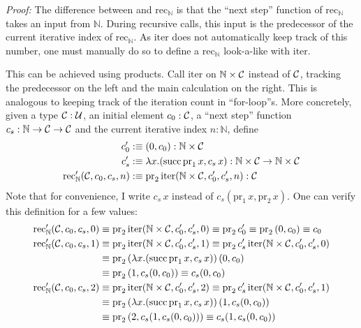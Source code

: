 \textit{Proof:} The difference between  and $\text{rec}_{\mathbb{N}}$ is that the ``next step'' function of $\text{rec}_{\mathbb{N}}$ takes an input from $\mathbb{N}$. During recursive calls, this input is the predecessor of the current iterative index of $\text{rec}_{\mathbb{N}}$. As $\text{iter}$ does not automatically keep track of this number, one must manually do so to define a $\text{rec}_{\mathbb{N}}$ look-a-like with $\text{iter}$.

This can be achieved using products. Call $\text{iter}$ on $\mathbb{N} \times \mathcal{C}$ instead of $\mathcal{C}$, tracking the predecessor on the left and the main calculation on the right. This is analogous to keeping track of the iteration count in ``for-loop''s. More concretely, given a type $\mathcal{C} : \mathcal{U}$, an initial element $c_{0} : \mathcal{C}$, a ``next step'' function $c_{s} : \mathbb{N} \to \mathcal{C} \to \mathcal{C}$ and the current iterative index $n : \mathbb{N}$, define
\begin{align*}
	c'_{0} &:\equiv (0, c_{0}) : \mathbb{N} \times \mathcal{C} \\
	c'_{s} &:\equiv \lambda x.(\text{succ}\,\text{pr}_{1}\,x,c_{s}\,x) : \mathbb{N} \times \mathcal{C} \to \mathbb{N} \times \mathcal{C} \\
	\text{rec}'_{\mathbb{N}}(\mathcal{C}, c_{0}, c_{s}, n) &:\equiv \text{pr}_{2}\,\text{iter}(\mathbb{N} \times \mathcal{C}, c'_{0}, c'_{s}, n) : \mathcal{C}
\end{align*}
Note that for convenience, I write $c_{s}\,x$ instead of $c_{s}(\text{pr}_{1}\,x,\text{pr}_{2}\,x)$. One can verify this definition for a few values:
\begin{align*}
	\text{rec}'_{\mathbb{N}}(\mathcal{C}, c_{0}, c_{s}, 0) &\equiv \text{pr}_{2}\,\text{iter}(\mathbb{N} \times \mathcal{C}, c'_{0}, c'_{s}, 0) \equiv \text{pr}_{2}\,c'_{0} \equiv \text{pr}_{2}\,(0,c_{0}) \equiv c_{0} \\
	\text{rec}'_{\mathbb{N}}(\mathcal{C}, c_{0}, c_{s}, 1) &\equiv \text{pr}_{2}\,\text{iter}(\mathbb{N} \times \mathcal{C}, c'_{0}, c'_{s}, 1) \equiv \text{pr}_{2}\,c'_{s}\,\text{iter}(\mathbb{N} \times \mathcal{C}, c'_{0}, c'_{s}, 0) \\
	&\equiv \text{pr}_{2}\,(\lambda x.(\text{succ}\,\text{pr}_{1}\,x,c_{s}\,x))\,(0,c_{0}) \\
	&\equiv \text{pr}_{2}\,(1,c_{s}(0,c_{0})) \equiv c_{s}(0,c_{0}) \\
	\text{rec}'_{\mathbb{N}}(\mathcal{C}, c_{0}, c_{s}, 2) &\equiv \text{pr}_{2}\,\text{iter}(\mathbb{N} \times \mathcal{C}, c'_{0}, c'_{s}, 2) \equiv \text{pr}_{2}\,c'_{s}\,\text{iter}(\mathbb{N} \times \mathcal{C}, c'_{0}, c'_{s}, 1) \\
	&\equiv \text{pr}_{2}\,(\lambda x.(\text{succ}\,\text{pr}_{1}\,x,c_{s}\,x))\,(1,c_{s}(0,c_{0})) \\
	&\equiv \text{pr}_{2}\,(2,c_{s}(1,c_{s}(0,c_{0}))) \equiv c_{s}(1,c_{s}(0,c_{0}))
\end{align*}
